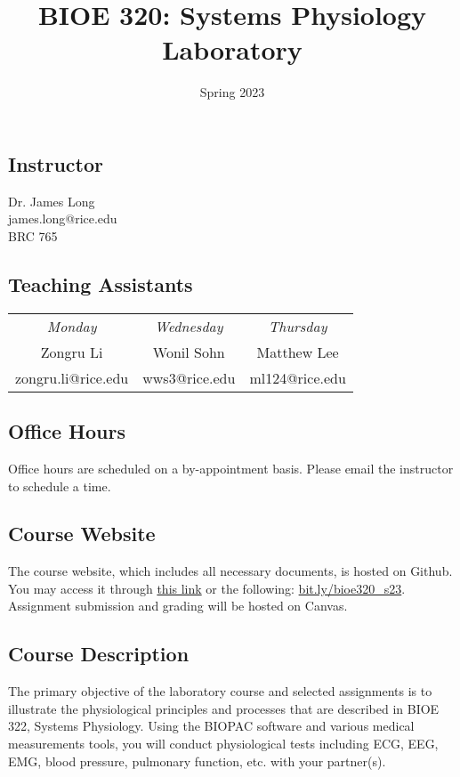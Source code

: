 \documentclass{article}
\title{BIOE 320: Systems Physiology Laboratory}
\author{Spring 2023}
\date{}
\begin{document}
\maketitle
\subsection*{Instructor}
Dr. James Long\\
james.long@rice.edu\\
BRC 765

\subsection*{Teaching Assistants}
\begin{table}[h!]
	\centering
\begin{tabular}[h!]{ccc}
\textit{Monday} & \textit{Wednesday} & \textit{Thursday}\\
Zongru Li & Wonil Sohn & Matthew Lee\\
zongru.li@rice.edu & wws3@rice.edu & ml124@rice.edu
\end{tabular}
\end{table}

\subsection*{Office Hours}
Office hours are scheduled on a by-appointment basis. Please email the instructor to schedule a time.

\subsection*{Course Website}
The course website, which includes all necessary documents, is hosted on Github. You may access it through \href{https://jameslong12.github.io/BIOE320}{this link} or the following: \href{https://bit.ly/bioe320_s23}{bit.ly/bioe320\_s23}. Assignment submission and grading will be hosted on Canvas.

\subsection*{Course Description}
The primary objective of the laboratory course and selected assignments is to illustrate the physiological principles and processes that are described in BIOE 322, Systems Physiology. Using the BIOPAC software and various medical measurements tools, you will conduct physiological tests including ECG, EEG, EMG, blood pressure, pulmonary function, etc. with your partner(s).
\end{document}
